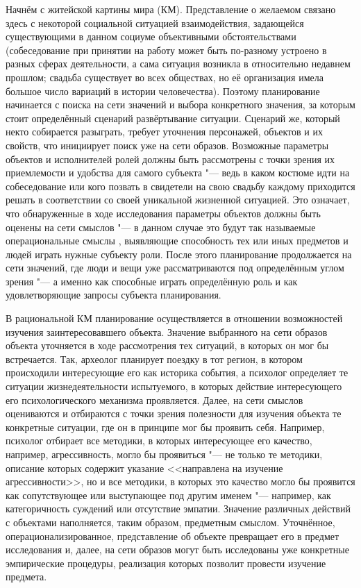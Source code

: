 \documentclass[a4paper, 12pt]{article}
\theoremstyle{plain}
\begin{document}
	Начнём с житейской картины мира (КМ). Представление о желаемом связано здесь с некоторой социальной ситуацией взаимодействия, задающейся существующими в данном социуме объективными обстоятельствами (собеседование при принятии на работу может быть по-разному устроено в разных сферах деятельности, а сама ситуация возникла в относительно недавнем прошлом; свадьба существует во всех обществах, но её организация имела большое число вариаций в истории человечества). Поэтому планирование начинается с поиска на сети значений и выбора конкретного значения, за которым стоит определённый сценарий развёртывание ситуации. Сценарий же, который некто собирается разыграть, требует уточнения персонажей, объектов и их свойств, что инициирует поиск уже на сети образов. Возможные параметры объектов и исполнителей ролей должны быть рассмотрены с точки зрения их приемлемости и удобства для самого субъекта "--- ведь в каком костюме идти на собеседование или кого позвать в свидетели на свою свадьбу каждому приходится решать в соответствии со своей уникальной жизненной ситуацией. Это означает, что обнаруженные в ходе исследования параметры объектов должны быть оценены на сети смыслов "--- в данном случае это будут так называемые операциональные смыслы \cite{Tikhomirov2002}, выявляющие способность тех или иных предметов и людей играть нужные субъекту роли. После этого планирование продолжается на сети значений, где люди и вещи уже рассматриваются под определённым углом зрения "--- а именно как способные играть определённую роль и как удовлетворяющие запросы субъекта планирования.
	
	В рациональной КМ планирование осуществляется в отношении возможностей изучения заинтересовавшего объекта. Значение выбранного на сети образов объекта уточняется в ходе рассмотрения тех ситуаций, в которых он мог бы встречается. Так, археолог планирует поездку в тот регион, в котором происходили интересующие его как историка события, а психолог определяет те ситуации жизнедеятельности испытуемого, в которых действие интересующего его психологического механизма проявляется. Далее, на сети смыслов оцениваются и отбираются с точки зрения полезности для изучения объекта те конкретные ситуации, где он в принципе мог бы проявить себя. Например, психолог отбирает все методики, в которых интересующее его качество, например, агрессивность, могло бы проявиться "--- не только те методики, описание которых содержит указание <<направлена на изучение агрессивности>>, но и все методики, в которых это качество могло бы проявится как сопутствующее или выступающее под другим именем "--- например, как категоричность суждений или отсутствие эмпатии. Значение различных действий с объектами наполняется, таким образом, предметным смыслом. Уточнённое, операционализированное, представление об объекте превращает его в предмет исследования и, далее, на сети образов могут быть исследованы уже конкретные эмпирические процедуры, реализация которых позволит провести изучение предмета.
	
\end{document}
